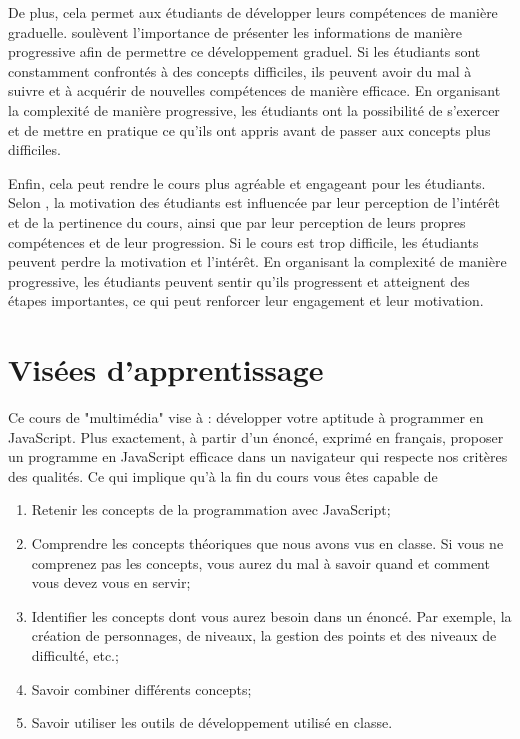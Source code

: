 De plus, cela permet aux étudiants de développer leurs compétences de manière graduelle. \citet{gagne1974principles} soulèvent l'importance de présenter les informations de manière progressive afin de permettre ce développement graduel. Si les étudiants sont constamment confrontés à des concepts difficiles, ils peuvent avoir du mal à suivre et à acquérir de nouvelles compétences de manière efficace. En organisant la complexité de manière progressive, les étudiants ont la possibilité de s'exercer et de mettre en pratique ce qu'ils ont appris avant de passer aux concepts plus difficiles.

Enfin, cela peut rendre le cours plus agréable et engageant pour les étudiants. Selon \citet{keller1987development}, la motivation des étudiants est influencée par leur perception de l'intérêt et de la pertinence du cours, ainsi que par leur perception de leurs propres compétences et de leur progression. Si le cours est trop difficile, les étudiants peuvent perdre la motivation et l'intérêt. En organisant la complexité de manière progressive, les étudiants peuvent sentir qu'ils progressent et atteignent des étapes importantes, ce qui peut renforcer leur engagement et leur motivation.

\clearpage
\section{Visées d’apprentissage}

Ce cours de "multimédia" vise à : développer votre aptitude à programmer en JavaScript. Plus exactement, à partir d'un énoncé, exprimé en français, proposer un programme en JavaScript efficace dans un navigateur qui respecte nos critères des qualités. Ce qui implique qu'à la fin du cours vous êtes capable de
\begin{enumerate}
    \item Retenir les concepts de la programmation avec JavaScript;
    \item Comprendre les concepts théoriques que nous avons vus en classe. Si vous ne comprenez pas les concepts, vous aurez du mal à savoir quand et comment vous devez vous en servir;
    \item Identifier les concepts dont vous aurez besoin dans un énoncé. Par exemple, la création de personnages, de niveaux, la gestion des points et des niveaux de difficulté, etc.;
    \item Savoir combiner différents concepts;
    \item Savoir utiliser les outils de développement utilisé en classe.\\
\end{enumerate}

